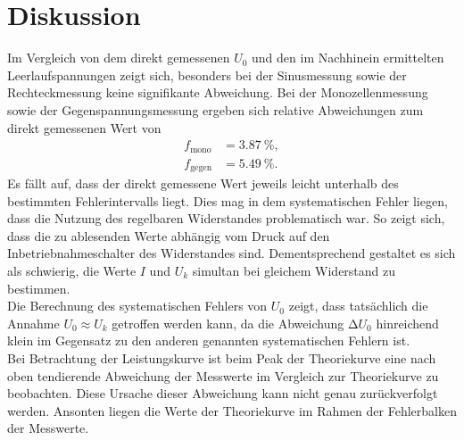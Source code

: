 \section{Diskussion}
\label{sec:Diskussion}
Im Vergleich von dem direkt gemessenen $U_0$ und den im Nachhinein ermittelten Leerlaufspannungen zeigt sich, besonders bei der Sinusmessung sowie der Rechteckmessung keine signifikante Abweichung.
Bei der Monozellenmessung sowie der Gegenspannungsmessung ergeben sich relative Abweichungen zum direkt gemessenen Wert von
\begin{align*}
f_{\text{mono}} &= \SI{3.87}{\percent}, \\
f_{\text{gegen}} &= \SI{5.49}{\percent}.
\end{align*}
Es fällt auf, dass der direkt gemessene Wert jeweils leicht unterhalb des bestimmten Fehlerintervalls liegt.
Dies mag in dem systematischen Fehler liegen, dass die Nutzung des regelbaren Widerstandes problematisch war.
So zeigt sich, dass die zu ablesenden Werte abhängig vom Druck auf den Inbetriebnahmeschalter des Widerstandes sind.
Dementsprechend gestaltet es sich als schwierig, die Werte $I$ und $U_k$ simultan bei gleichem Widerstand zu bestimmen. \\
Die Berechnung des systematischen Fehlers von $U_0$ zeigt, dass tatsächlich die Annahme $U_0 \approx U_k$ getroffen werden kann, da die Abweichung $\increment{U_0}$ hinreichend klein im Gegensatz zu den anderen genannten systematischen Fehlern ist.\\
Bei Betrachtung der Leistungskurve ist beim Peak der Theoriekurve eine nach oben tendierende Abweichung der Messwerte im Vergleich zur Theoriekurve zu beobachten.
Diese Ursache dieser Abweichung kann nicht genau zurückverfolgt werden.
Ansonten liegen die Werte der Theoriekurve im Rahmen der Fehlerbalken der Messwerte.

